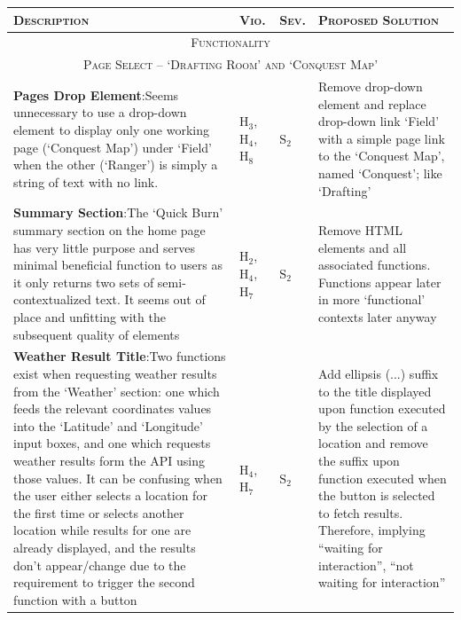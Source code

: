 \documentclass[11pt, english]{article}
\begin{document}
	\begin{center}
                \scriptsize
        \begin{longtable}{p{7.5cm}p{0.5cm}p{0.5cm}p{4cm}}
                \textsc{Description} & \textsc{Vio.} & \textsc{Sev.} & \textsc{Proposed Solution}\\
                \hline
		\hline
		\multicolumn{4}{c}{\textsc{Functionality}}\\
		\hline
		\hline
		\multicolumn{4}{c}{\textsc{Page Select -- `Drafting Room' and `Conquest Map'}}\\
		\hline
		\textbf{Pages Drop Element}:\newline Seems unnecessary to use a drop-down element to display only one working page (`Conquest Map') under `Field' when the other (`Ranger') is simply a string of text with no link. & $\mathrm{H_{3}}$, $\mathrm{H_{4}}$, $\mathrm{H_{8}}$ & $\mathrm{S_{2}}$ & Remove drop-down element and replace drop-down link `Field' with a simple page link to the `Conquest Map', named `Conquest'; like `Drafting'\\
		\textbf{Summary Section}:\newline The `Quick Burn' summary section on the home page has very little purpose and serves minimal beneficial function to users as it only returns two sets of semi-contextualized text. It seems out of place and unfitting with the subsequent quality of elements & $\mathrm{H_{2}}$, $\mathrm{H_{4}}$, $\mathrm{H_{7}}$ & $\mathrm{S_{2}}$ & Remove HTML elements and all associated functions. Functions appear later in more `functional' contexts later anyway\\
		\textbf{Weather Result Title}:\newline Two functions exist when requesting weather results from the `Weather' section: one which feeds the relevant coordinates values into the `Latitude' and `Longitude' input boxes, and one which requests weather results form the API using those values. It can be confusing when the user either selects a location for the first time or selects another location while results for one are already displayed, and the results don't appear/change due to the requirement to trigger the second function with a button & $\mathrm{H_{4}}$, $\mathrm{H_{7}}$ & $\mathrm{S_{2}}$ & Add ellipsis (...) suffix to the title displayed upon function executed by the selection of a location and remove the suffix upon function executed when the button is selected to fetch results. Therefore, implying ``waiting for interaction'', ``not waiting for interaction''\\

\end{longtable}
\end{center}
\end{document}

